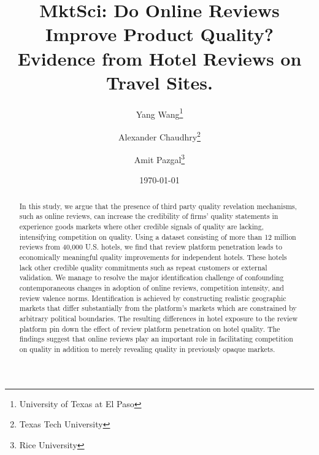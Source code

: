 \documentclass[12pt, leqno]{article}
\begin{document}
% 
\begin{titlepage}
\title{MktSci: Do Online Reviews Improve Product Quality? \\
Evidence from Hotel Reviews on Travel Sites.}
\author{Yang Wang\thanks{University of Texas at El Paso} \and Alexander Chaudhry\footnotemark[2]\thanks{Texas Tech University}\and Amit Pazgal\footnotemark[2]\thanks{Rice University}}%
\date{\today}
\maketitle
\begin{abstract}
In this study, we argue that the presence of third party quality revelation mechanisms, such as online reviews, can increase the credibility of firms' quality statements in experience goods markets where other credible signals of quality are lacking, intensifying competition on quality. Using a dataset consisting of more than 12 million reviews from 40,000 U.S. hotels, we find that review platform penetration leads to economically meaningful quality improvements for independent hotels. These hotels lack other credible quality commitments such as repeat customers or external validation. We manage to resolve the major identification challenge of confounding contemporaneous changes in adoption of online reviews, competition intensity, and review valence norms. Identification is achieved by constructing realistic geographic markets that differ substantially from the platform's markets which are constrained by arbitrary political boundaries. The resulting differences in hotel exposure to the review platform pin down the effect of review platform penetration on hotel quality. The findings suggest that online reviews play an important role in facilitating competition on quality in addition to merely revealing quality in previously opaque markets.


\end{abstract}
\end{titlepage}
\end{document}
